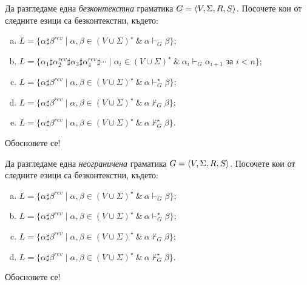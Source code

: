 \begin{problem}
  Да разгледаме една {\em безконтекстна} граматика $G = \langle{V,\Sigma,R,S}\rangle$.
  Посочете кои от следните езици са безконтекстни, където:
  \begin{enumerate}[a)]
  \item 
    $L = \{\alpha\sharp\beta^{rev} \mid \alpha,\beta \in (V \cup \Sigma)^\star\ \&\ \alpha \vdash_G \beta\}$;
  \item
    $L = \{\alpha_1\sharp\alpha^{rev}_2\sharp\alpha_3\sharp\alpha^{rev}_4\sharp \cdots \mid \alpha_i \in (V \cup \Sigma)^\star\ \&\ \alpha_i \vdash_G \alpha_{i+1} \text{ за }i<n\}$;
  \item 
    $L = \{\alpha\sharp\beta^{rev} \mid \alpha,\beta \in (V \cup \Sigma)^\star\ \&\ \alpha \vdash^\star_G \beta\}$;
  \item
    $L = \{\alpha\sharp\beta^{rev} \mid \alpha,\beta \in (V \cup \Sigma)^\star\ \&\ \alpha \not\vdash_G \beta\}$;
  \item
    $L = \{\alpha\sharp\beta^{rev} \mid \alpha,\beta \in (V \cup \Sigma)^\star\ \&\ \alpha \not\vdash^\star_G \beta\}$.
  \end{enumerate}
  Обосновете се!
\end{problem}

\begin{problem}
  Да разгледаме една {\em неограничена} граматика $G = \langle{V,\Sigma,R,S}\rangle$.
  Посочете кои от следните езици са безконтекстни, където:
  \begin{enumerate}[a)]
  \item 
    $L = \{\alpha\sharp\beta^{rev} \mid \alpha,\beta \in (V \cup \Sigma)^\star\ \&\ \alpha \vdash_G \beta\}$;
  \item 
    $L = \{\alpha\sharp\beta^{rev} \mid \alpha,\beta \in (V \cup \Sigma)^\star\ \&\ \alpha \vdash^\star_G \beta\}$;
  \item
    $L = \{\alpha\sharp\beta^{rev} \mid \alpha,\beta \in (V \cup \Sigma)^\star\ \&\ \alpha \not\vdash_G \beta\}$;
  \item
    $L = \{\alpha\sharp\beta^{rev} \mid \alpha,\beta \in (V \cup \Sigma)^\star\ \&\ \alpha \not\vdash^\star_G \beta\}$.
  \end{enumerate}
  Обосновете се!
\end{problem}




